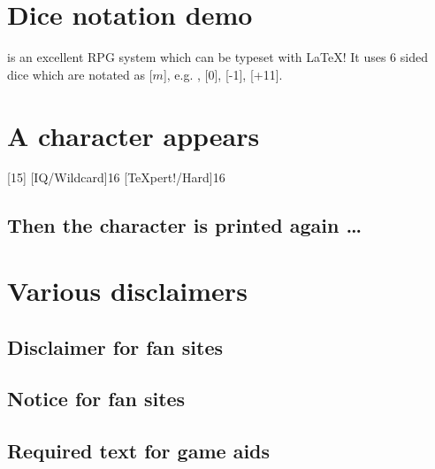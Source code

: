 \documentclass{article}
\begin{document}
\tableofcontents

\section{Dice notation demo}
\label{sec:dice-notation-demo}

\gurps is an excellent RPG system which can be typeset with \LaTeX{}! It uses 6
sided dice which are notated as [$m$], e.g. , [0], [-1], [+11].

\section{A character appears}
\label{sec:character-appears}

\begin{character}
  [15]
  [IQ/Wildcard]{16}
  [\TeX pert!/Hard]{16}

\end{character}

\subsection{Then the character is printed again \ldots{}}
\label{sec:then-char-prepr}



\section{Various disclaimers}
\label{sec:various-disclaimers}

\subsection{Disclaimer for fan sites}
\label{sec:disclaimer-fan-sites}

\SJGamesOnlinePolicyDisclaimer

\subsection{Notice for fan sites}
\label{sec:disclaimer-fan-sites}

\SJGamesOnlinePolicyNotice

\subsection{Required text for game aids}
\label{sec:disclaimer-fan-sites}

\end{document}
